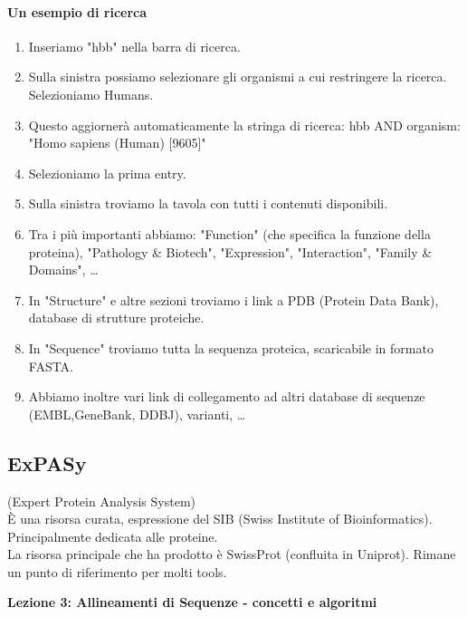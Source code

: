 \documentclass{article}
\begin{document}
\paragraph{Un esempio di ricerca}
\begin{enumerate}
    \item Inseriamo "{\ttfamily hbb}" nella barra di ricerca.
    \item Sulla sinistra possiamo selezionare gli organismi a cui restringere la ricerca. Selezioniamo Humans.
    \item Questo aggiornerà automaticamente la stringa di ricerca: {\ttfamily hbb AND organism: "Homo sapiens (Human) [9605]"}
    \item Selezioniamo la prima entry.
    \item Sulla sinistra troviamo la tavola con tutti i contenuti disponibili.
    \item Tra i più importanti abbiamo: "Function" (che specifica la funzione della proteina), "Pathology \& Biotech", "Expression", "Interaction", "Family \& Domains", \dots
    \item In "Structure" e altre sezioni troviamo i link a PDB (Protein Data Bank), database di strutture proteiche.
    \item In "Sequence" troviamo tutta la sequenza proteica, scaricabile in formato FASTA.
    \item Abbiamo inoltre vari link di collegamento ad altri database di sequenze (EMBL,GeneBank, DDBJ), varianti, \dots
\end{enumerate}
\subsection{ExPASy}
(Expert Protein Analysis System)\\
È una risorsa curata, espressione del SIB (Swiss Institute of
Bioinformatics). Principalmente dedicata alle proteine.\\
La risorsa principale che ha prodotto è SwissProt (confluita in Uniprot). Rimane un punto di riferimento per molti tools. 

\begin{titlepage}
    \begin{center}
        \vspace*{1cm}
        \LARGE
        \textbf{Lezione 3: Allineamenti di Sequenze - concetti e algoritmi}

    \end{center}
\end{titlepage}
\setcounter{page}{19}
\end{document}
